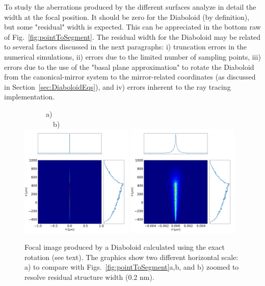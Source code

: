 \documentclass{iucr}              %
\begin{document}
To study the aberrations produced by the different surfaces analyze in detail the width at the focal position. It should be zero for the Diaboloid (by definition), but some "residual" width is expected. This can be appreciated in the bottom raw of Fig.~\ref{fig:pointToSegment}. The residual width for the Diaboloid may be related to several factors discussed in the next paragraphs: i) truncation errors in the numerical simulations, ii) errors due to the limited number of sampling points, iii) errors due to the use of the "basal plane approximation" to rotate the Diaboloid from the canonical-mirror system to the mirror-related coordinates (as discussed in Section~\ref{sec:DiaboloidEqs}), and iv) errors inherent to the ray tracing implementation. 

\begin{figure}[h]
\flushleft
~~~~~~a)~~~~~~~~~~~~~~~~~~~~~~~~~~~~~~~~~~~~~~~~~~~~~~~~~~~~~~~~~~~~b)\\
\centering
\includegraphics[width=0.48\textwidth]{figures/p2s_mathematica1.png}
\includegraphics[width=0.48\textwidth]{figures/p2s_matematica2.png}
\caption{\label{fig:mathematica}Focal image produced by a Diaboloid calculated using the exact rotation (see text). The graphics show two different horizontal scale: a) to compare with Figs.~\ref{fig:pointToSegment}a,b, and b) zoomed to resolve residual structure width (0.2 nm).
}
\end{figure}
\end{document}
